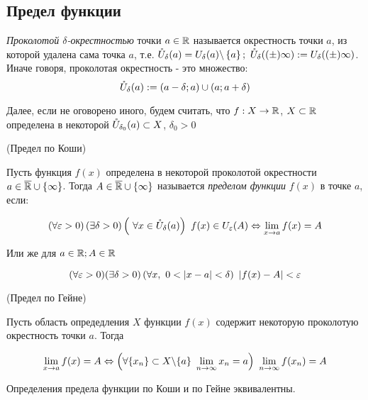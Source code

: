\subsection{Предел функции}

\begin{definition}
	\textit{Проколотой $\delta$-окрестностью} точки $a \in \mathbb{R}$ называется окрестность
	точки $a$, из которой удалена сама точка $a$, т.е. 
	$\mathring{U}_{\delta}(a) = U_{\delta}(a) \backslash \left\{a\right\};
	\ \mathring{U}_{\delta}((\pm)\infty) := U_{\delta}((\pm)\infty)$.
	Иначе говоря, проколотая окрестность - это множество:
	\[
		\mathring{U}_{\delta}(a) := (a - \delta; a) \cup (a; a + \delta)
	\]
\end{definition}

\begin{note}
	Далее, если не оговорено иного,
	будем считать, что $f : X \rightarrow \mathbb{R}$, $X \subset \mathbb{R}$
	определена в некоторой $\mathring{U}_{\delta_0}(a)
	\subset X$, $\delta_0 > 0$
\end{note}

\begin{definition} (Предел по Коши)
	
	Пусть функция $f(x)$ определена в некоторой
	проколотой окрестности $a \in \overline{\mathbb{R}} \cup \left\{\infty\right\}$. 
	Тогда $A \in \overline{\mathbb{R}} \cup \left\{\infty\right\}$ называется
	\textit{пределом функции} $f(x)$ в точке $a$, если:

	\[
		\left(\forall \varepsilon > 0\right)\left(\exists \delta > 0
		\right)\left(\ \forall x \in \mathring{U}_{\delta}(a)\right)
		\ f(x) \in U_{\varepsilon}(A) \Leftrightarrow \lim\limits_{x \to a} f(x) = A
	\]

	Или же для $a \in \mathbb{R}; A \in \mathbb{R}$

	\[
		(\forall \eps > 0)(\exists \delta > 0)
		\left(\forall x,\ 0 < |x - a| < \delta\right) \ 
		|f(x) - A| < \eps
	\]
\end{definition}

\begin{definition} (Предел по Гейне)
	
	Пусть область опредедления $X$ функции $f(x)$ содержит некоторую
	проколотую окрестность точки $a$. Тогда
	
	\[
		\lim\limits_{x \to a} f(x) = A \Leftrightarrow \left(\forall \{x_n\}
		\subset X \backslash \{a\}\ \lim\limits_{n \to \infty} x_n = a\right)
		\ \lim\limits_{n \to \infty} f(x_n) = A
	\]
\end{definition}

\begin{theorem}
	Определения предела функции по Коши и по Гейне эквивалентны.
\end{theorem}

